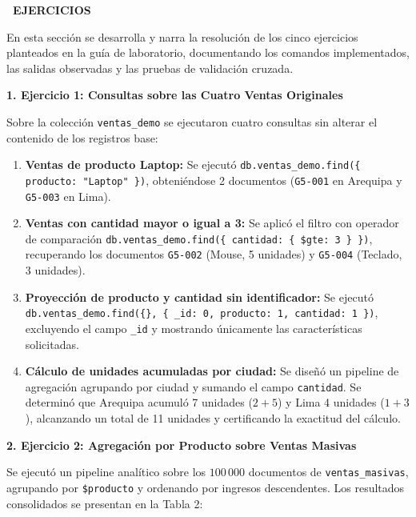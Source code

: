 \documentclass[12pt,a4paper]{article}
\newcommand{\llav}{\symbol{60}\symbol{60}}
\newcommand{\rlav}{\symbol{62}\symbol{62}}
\newcommand{\marcador}[1]{\llav\ #1\ \rlav}
\newcommand{\seccion}[1]{%
  \vspace{0.6cm}%
  {\centering\bfseries\fontsize{12pt}{14pt}\selectfont\marcador{\MakeUppercase{#1}}\par}%
  \vspace{0.35cm}%
}
\begin{document}
\clearpage

\seccion{EJERCICIOS}

En esta sección se desarrolla y narra la resolución de los cinco ejercicios planteados en la guía de laboratorio, documentando los comandos implementados, las salidas observadas y las pruebas de validación cruzada.

\vspace{0.2cm}
\noindent\textbf{1. Ejercicio 1: Consultas sobre las Cuatro Ventas Originales}

Sobre la colección \texttt{ventas\_demo} se ejecutaron cuatro consultas sin alterar el contenido de los registros base:

\begin{enumerate}[label=\alph*)]
    \item \textbf{Ventas de producto Laptop:} Se ejecutó \texttt{db.ventas\_demo.find(\{ producto: "Laptop" \})}, obteniéndose 2 documentos (\texttt{G5-001} en Arequipa y \texttt{G5-003} en Lima).
    \item \textbf{Ventas con cantidad mayor o igual a 3:} Se aplicó el filtro con operador de comparación \texttt{db.ventas\_demo.find(\{ cantidad: \{ \$gte: 3 \} \})}, recuperando los documentos \texttt{G5-002} (Mouse, 5 unidades) y \texttt{G5-004} (Teclado, 3 unidades).
    \item \textbf{Proyección de producto y cantidad sin identificador:} Se ejecutó \texttt{db.ventas\_demo.find(\{\}, \{ \_id: 0, producto: 1, cantidad: 1 \})}, excluyendo el campo \texttt{\_id} y mostrando únicamente las características solicitadas.
    \item \textbf{Cálculo de unidades acumuladas por ciudad:} Se diseñó un pipeline de agregación agrupando por ciudad y sumando el campo \texttt{cantidad}. Se determinó que Arequipa acumuló 7 unidades ($2 + 5$) y Lima 4 unidades ($1 + 3$), alcanzando un total de 11 unidades y certificando la exactitud del cálculo.
\end{enumerate}

\vspace{0.2cm}
\noindent\textbf{2. Ejercicio 2: Agregación por Producto sobre Ventas Masivas}

Se ejecutó un pipeline analítico sobre los $100\,000$ documentos de \texttt{ventas\_masivas}, agrupando por \texttt{\$producto} y ordenando por ingresos descendentes. Los resultados consolidados se presentan en la Tabla 2:
\end{document}
